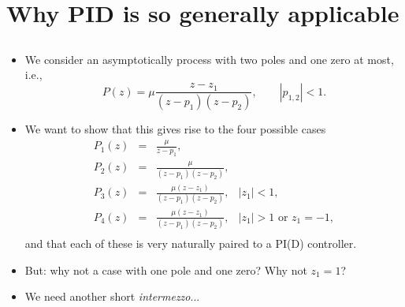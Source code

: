 \section{Why PID is so generally applicable}
\subsection{}

\begin{frame}
\myPause
 \begin{itemize}[<+-| alert@+>]
 \item We consider an asymptotically  process with two poles and one zero at most, i.e.,
       \begin{displaymath}
        P(z) = \mu \frac{z-z_1}{(z-p_1)(z-p_2)}, \qquad |p_{1,2}|<1.
       \end{displaymath}
 \item We want to show that this gives rise to the four possible cases
       \begin{displaymath}
        \begin{array}{rcll}
         P_1(z) &=& \frac{\mu}{z-p_1},                                               \\
         P_2(z) &=& \frac{\mu}{(z-p_1)(z-p_2)},                                      \\
         P_3(z) &=& \frac{\mu(z-z_1)}{(z-p_1)(z-p_2)}, & |z_1|<1,                    \\
         P_4(z) &=& \frac{\mu(z-z_1)}{(z-p_1)(z-p_2)}, & |z_1|>1 \text{ or } z_1=-1, \\
        \end{array}
       \end{displaymath}
       and that each of these is very naturally paired to a PI(D) controller.
 \item But: why not a case with one pole and one zero? Why not $z_1=1$?
 \item We need another short \emph{intermezzo}...
 \end{itemize}
\end{frame}


